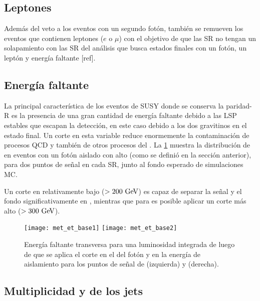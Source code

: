 \subsection{Leptones}\label{sec:leptonphoton_veto}

Además del veto a los eventos con un segundo fotón, también se remueven
los eventos que contienen leptones ($e$ o $\mu$) con el objetivo de que las
SR no tengan un solapamiento con las SR del análisis que busca estados finales
con un fotón, un leptón y energía faltante [ref].



\subsection{Energía faltante}

La principal característica de los eventos de SUSY donde se conserva
la paridad-R es la presencia de una gran cantidad de energía faltante debido
a las LSP estables que escapan la detección, en este caso debido a los dos gravitinos
en el estado final.
Un corte en esta variable reduce enormemente la contaminación de procesos
QCD y también de otros procesos del {\SM}.
La \cref{fig:opt_met} muestra la distribución de {\met} en eventos con
un fotón aislado con alto {\pt} (como se definió en la sección anterior),
para dos puntos de señal en cada SR, junto al fondo esperado de simulaciones
MC.

Un corte en {\met} relativamente bajo ($> 200 \gev$) es capaz de separar
la señal y el fondo significativamente en {\SRL}, mientras que para {\SRH}
es posible aplicar un corte más alto ($>300\gev$).

\begin{figure}[!htbp]
  \centering
  \texttt{[image: met\_et\_base1]}
  \texttt{[image: met\_et\_base2]}
  \caption{Energía faltante transversa para una luminosidad integrada de {\ilumi}
    luego de que se aplica el corte en el {\pt} del fotón y en la energía de aislamiento
    para los puntos de señal de {\SRL} (izquierda) y {\SRH} (derecha). }
  \label{fig:opt_met}
\end{figure}



\subsection{Multiplicidad y {\pt} de los jets} \label{sec:opt_njet}

